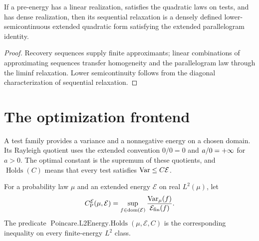 \begin{theorem}
  \label{thm:quadratic-relaxation-closed}
  \leanok
  If a pre-energy has a linear realization, satisfies the quadratic laws on tests, and has dense
  realization, then its sequential relaxation is a densely defined lower-semicontinuous extended
  quadratic form satisfying the extended parallelogram identity.
\end{theorem}
\begin{proof}
  \leanok
  Recovery sequences supply finite approximants; linear combinations of approximating sequences
  transfer homogeneity and the parallelogram law through the liminf relaxation.  Lower
  semicontinuity follows from the diagonal characterization of sequential relaxation.
\end{proof}

\section{The optimization frontend}

\begin{definition}
  \label{def:poincare-test-family}
  \leanok
  A test family provides a variance and a nonnegative energy on a chosen domain.  Its Rayleigh
  quotient uses the extended convention $0/0=0$ and $a/0=+\infty$ for $a>0$.
  The optimal constant is the supremum of these quotients, and
  $\operatorname{Holds}(C)$ means that every test satisfies $\operatorname{Var}\le C\mathcal E$.
\end{definition}

\begin{definition}
  \label{def:l2-energy-poincare-constant}
  \leanok
  For a probability law $\mu$ and an extended energy $\mathcal E$ on real $L^2(\mu)$, let
  \[
    C_{\mathrm P}^{\mathcal E}(\mu,\mathcal E)
      =\sup_{f\in\operatorname{dom}(\mathcal E)}
        \frac{\operatorname{Var}_\mu(f)}{\mathcal E_{\mathrm{fin}}(f)}.
  \]
  The predicate $\operatorname{Poincare.L2Energy.Holds}(\mu,\mathcal E,C)$ is the corresponding inequality
  on every finite-energy $L^2$ class.
\end{definition}

